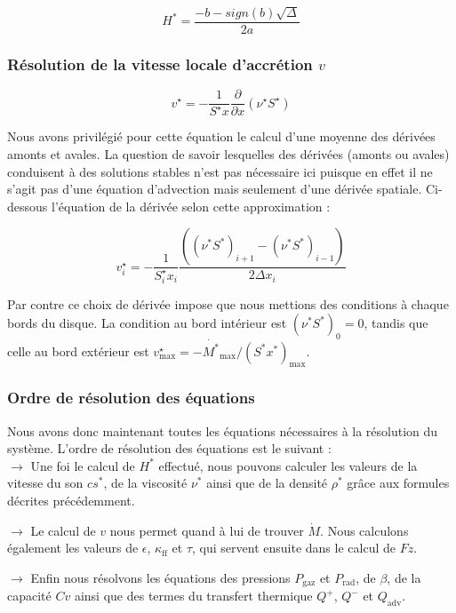 \begin{equation}
	H^{*} = \frac{-b -sign(b) \sqrt{\Delta}}{2a}
\end{equation}


\subsubsection{Résolution de la vitesse locale d'accrétion $v$}
\begin{equation}
    v^\star = - \frac{1}{S^\star x} \frac{\partial}{\partial x} \left(\nu^\star S^\star\right)
\end{equation} 

Nous avons privilégié pour cette équation le calcul d'une moyenne des dérivées amonts et avales. La question de savoir lesquelles des dérivées (amonts ou avales) conduisent à  des solutions stables n'est pas nécessaire ici puisque en effet il ne s'agit pas d'une équation d'advection mais seulement d'une dérivée spatiale. Ci-dessous l'équation de la dérivée selon cette approximation : 

\begin{equation}
v^\star_{i} = - \frac{1}{S_{i}^\star x_{i}} \frac{( (\nu^{*}S^{*})_{i+1} - (\nu^{*}S^{*})_{i-1} )}{2 \Delta x_{i}}
\end{equation} 

Par contre ce choix de dérivée impose que nous mettions des conditions à  chaque bords du disque. La condition au bord intérieur est  $(\nu^{*}S^{*})_{0} = 0$, tandis que celle au bord extérieur est $v^\star_\textrm{max}   = - \dot{M^{*}}_\textrm{max} / (S^{*}x^{*})_\textrm{max}$.


\subsubsection{Ordre de résolution des équations}

Nous avons donc maintenant toutes les équations  nécessaires à  la résolution du système. L'ordre de résolution des équations est le suivant :  \\

 $\rightarrow$ Une foi le calcul de $H^{*}$ effectué, nous pouvons calculer les valeurs de la vitesse du son $cs^{*}$, de la viscosité $\nu^{*}$ ainsi que de la densité $\rho^{*}$ grâce aux formules décrites précédemment.   

 $\rightarrow$ Le calcul de $v$ nous permet quand à lui de trouver $\dot{M}$. Nous calculons également les valeurs de $\epsilon$,  $\kappa_\textrm{ff}$ et $\tau$, qui servent ensuite dans le calcul de $Fz$.
 
 $\rightarrow$ Enfin nous résolvons les équations des pressions $P_\textrm{gaz}$ et $P_\textrm{rad}$, de $\beta$,  de la capacité $Cv$ ainsi que des termes du transfert thermique $Q^{+}$, $Q^{-}$ et $Q_\textrm{adv}$.



